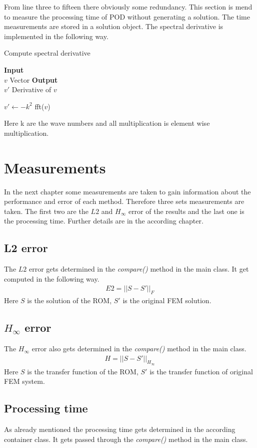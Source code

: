 From line three to fifteen there obviously some redundancy.
This section is mend to measure the processing time of POD without generating a solution.
The time measurements are stored in a solution object.
The spectral derivative is implemented in the following way.
\begin{algorithm}[H]
\caption{Compute spectral derivative}
\textbf{Input} \\
\hspace*{\algorithmicindent} $v$ Vector
\textbf{Output} \\
\hspace*{\algorithmicindent} $v'$ Derivative of $v$
\begin{algorithmic}[1]
\State $v' \gets -k^{2}$ fft($v$)
\EndProcedure
\end{algorithmic}
\end{algorithm}
Here k are the wave numbers and all multiplication is element wise multiplication.

\section{Measurements}
In the next chapter some measurements are taken to gain information about the performance and error of each method.
Therefore three sets measurements are taken.
The first two are the \(L2\) and \(H_{\infty}\) error of the results and the last one is the processing time.
Further details are in the according chapter.
\subsection{L2 error}
The \(L2\) error gets determined in the \textit{compare()} method in the main class.
It get computed in the following way.
\begin{gather}
E2 = ||S - S'||_{F}
\end{gather}
Here \(S\) is the solution of the ROM, \(S'\) is the original FEM solution.

\subsection{$H_{\infty}$ error}
The \(H_{\infty}\) error also gets determined in the \textit{compare()} method in the main class.
\begin{gather}
H = ||S - S'||_{H_{\infty}}
\end{gather}
Here \(S\) is the transfer function of the ROM, \(S'\) is the transfer function of original FEM system.
\subsection{Processing time}
As already mentioned the processing time gets determined in the according container class.
It gets passed through the \textit{compare()} method in the main class.





